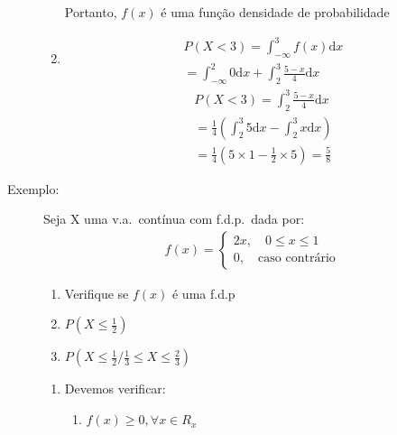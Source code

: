\begin{description}
\begin{enumerate}[label=(\alph*)]
\begin{enumerate}[leftmargin=*, label=\roman*., widest=IV, align=left]
           \end{enumerate}
             Portanto, $f(x)$ é uma função densidade de probabilidade 
           \item 
             \begin{align*}
               P(X<3)= \int_{-\infty}^{3} f(x)\mathrm{d}x \\
               =\int_{-\infty}^{2} 0 \mathrm{d}x + \int_{2}^{3} \frac{5-x}{4} \mathrm{d}x 
             \end{align*}
             \begin{align*}
               P(X<3)=\int_{2}^{3} \frac{5-x}{4} \mathrm{d}x \\
               = \frac{1}{4} \left(\int_{2}^{3} 5 \mathrm{d}x - \int_{2}^{3} x \mathrm{d}x \right)\\
               =\frac{1}{4} \left(5\times 1- \frac{1}{2}\times 5\right)= \frac{5}{8}
             \end{align*}
         \end{enumerate}
       \item [Exemplo:] Seja X uma v.a.\ contínua com f.d.p.\ dada por:
         \begin{align*}
           f(x)= 
           \begin{cases}
             2x,\quad 0\leq x \leq 1 \\ 
             0, \quad \text{caso contrário}
           \end{cases}
         \end{align*}
         \begin{enumerate}[label=(\alph*)]
           \item Verifique se $f(x)$ é uma f.d.p
           \item$ P \left( X\le \frac{1}{2}\right)$
           \item $P \left(X\le \frac{1}{2} / \frac{1}{3} \le X \le \frac{2}{3}\right)$
         \end{enumerate}
         \begin{enumerate}[label=(\alph*)]
           \item 
             Devemos verificar: 
             \begin{enumerate}[leftmargin=*, label=\roman*., widest=IV, align=left] %

               \item $f(x)\geq 0, \forall x \in R_{x}$


\end{enumerate}
\end{enumerate}
\end{description}
